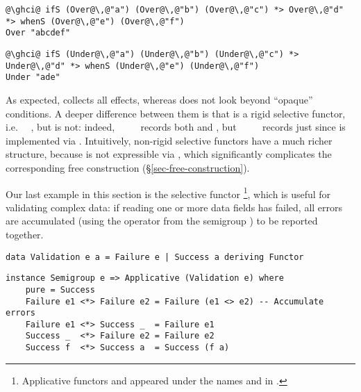 {\vspace{1mm}
\begin{verbatim}
@\ghci@ ifS (Over@\,@"a") (Over@\,@"b") (Over@\,@"c") *> Over@\,@"d" *> whenS (Over@\,@"e") (Over@\,@"f")
Over "abcdef"
\end{verbatim}
\vspace{1mm}
\begin{verbatim}
@\ghci@ ifS (Under@\,@"a") (Under@\,@"b") (Under@\,@"c") *> Under@\,@"d" *> whenS (Under@\,@"e") (Under@\,@"f")
Under "ade"
\end{verbatim}
\vspace{1mm}

\noindent
As expected,  collects all effects, whereas  does not look
beyond ``opaque'' conditions. A deeper difference between them is that 
is a rigid selective functor, i.e. \hs{(<*>)}~\hs{=}~, but  is
not: indeed, ~~\hs{<*>}~~ records both
 and , but ~~~~
records just  since  is implemented via .
Intuitively, non-rigid selective functors have a much richer structure, because
\hs{<*>} is not expressible via , which significantly complicates the
corresponding free construction (\S\ref{sec-free-construction}).

Our last example in this section is the selective functor
\footnote{Applicative functors  and 
appeared under the names  and  in
\citep{mcbride2008applicative}.}, which is useful for validating complex data:
if reading one or more data fields has failed, all errors are accumulated (using
the operator \hs{<>} from the semigroup ) to be reported together.

\vspace{1mm}
\begin{verbatim}
data Validation e a = Failure e | Success a deriving Functor
\end{verbatim}
\vspace{1mm}
\begin{verbatim}
instance Semigroup e => Applicative (Validation e) where
    pure = Success
    Failure e1 <*> Failure e2 = Failure (e1 <> e2) -- Accumulate errors
    Failure e1 <*> Success _  = Failure e1
    Success _  <*> Failure e2 = Failure e2
    Success f  <*> Success a  = Success (f a)
\end{verbatim}
\vspace{1mm}

}
